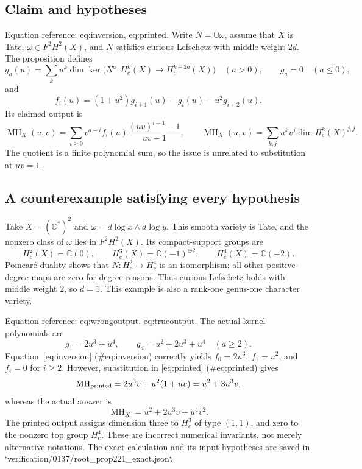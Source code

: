 \documentclass[10pt]{article}
\begin{document}
\subsection*{Claim and hypotheses}
Equation reference: eq:inversion, eq:printed. Write \(N=\cup\omega\), assume that \(X\) is Tate, \(\omega\in F^2H^2(X)\), and \(N\) satisfies curious Lefschetz with middle weight \(2d\). The proposition defines \[g_a(u)=\sum_k u^k\dim\ker\bigl(N^a:H_c^k(X)\longrightarrow
 H_c^{k+2a}(X)\bigr)\quad(a>0),\qquad g_a=0\quad(a\le0),\] and \[
 f_i(u)=(1+u^2)g_{i+1}(u)-g_i(u)-u^2g_{i+2}(u).\] Its claimed output is \[
 \operatorname{MH}_X(u,v)=\sum_{i\ge0}v^{d-i}f_i(u)
       \frac{(uv)^{i+1}-1}{uv-1},
 \qquad
 \operatorname{MH}_X(u,v)=\sum_{k,j}u^kv^j\dim H_c^k(X)^{j,j}.\] The quotient is a finite polynomial sum, so the issue is unrelated to substitution at \(uv=1\).\par
\subsection*{A counterexample satisfying every hypothesis}
Take \(X=(\mathbb C^*)^2\) and \(\omega=d\log x\wedge d\log y\). This smooth variety is Tate, and the nonzero class of \(\omega\) lies in \(F^2H^2(X)\). Its compact-support groups are \[H_c^2(X)=\mathbb C(0),\qquad
 H_c^3(X)=\mathbb C(-1)^{\oplus2},\qquad
 H_c^4(X)=\mathbb C(-2).\] Poincaré duality shows that \(N:H_c^2\to H_c^4\) is an isomorphism; all other positive-degree maps are zero for degree reasons. Thus curious Lefschetz holds with middle weight \(2\), so \(d=1\). This example is also a rank-one genus-one character variety.\par
Equation reference: eq:wrongoutput, eq:trueoutput. The actual kernel polynomials are \[g_1=2u^3+u^4,\qquad
 g_a=u^2+2u^3+u^4\quad(a\ge2).\] Equation [eq:inversion] (\#eq:inversion) correctly yields \(f_0=2u^3,\ f_1=u^2\), and \(f_i=0\) for \(i\ge2\). However, substitution in [eq:printed] (\#eq:printed) gives \[
 \operatorname{MH}_{\rm printed}=2u^3v+u^2(1+uv)=u^2+3u^3v,\] whereas the actual answer is \[
 \operatorname{MH}_X=u^2+2u^3v+u^4v^2.\] The printed output assigns dimension three to \(H_c^3\) of type \((1,1)\), and zero to the nonzero top group \(H_c^4\). These are incorrect numerical invariants, not merely alternative notations. The exact calculation and its input hypotheses are saved in `verification/0137/root\_prop221\_exact.json`.\par
\end{document}
